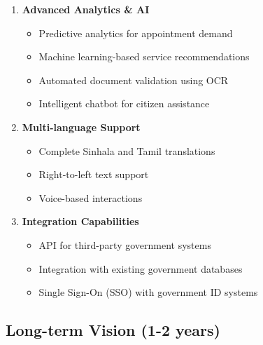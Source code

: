 \documentclass[11pt,a4paper]{article}
\begin{document}
\begin{enumerate}[leftmargin=*]
    \item \textbf{Advanced Analytics \& AI}
    \begin{itemize}
        \item Predictive analytics for appointment demand
        \item Machine learning-based service recommendations
        \item Automated document validation using OCR
        \item Intelligent chatbot for citizen assistance
    \end{itemize}
    
    \item \textbf{Multi-language Support}
    \begin{itemize}
        \item Complete Sinhala and Tamil translations
        \item Right-to-left text support
        \item Voice-based interactions
    \end{itemize}
    
    \item \textbf{Integration Capabilities}
    \begin{itemize}
        \item API for third-party government systems
        \item Integration with existing government databases
        \item Single Sign-On (SSO) with government ID systems
    \end{itemize}
\end{enumerate}

\subsection{Long-term Vision (1-2 years)}
\end{document}
